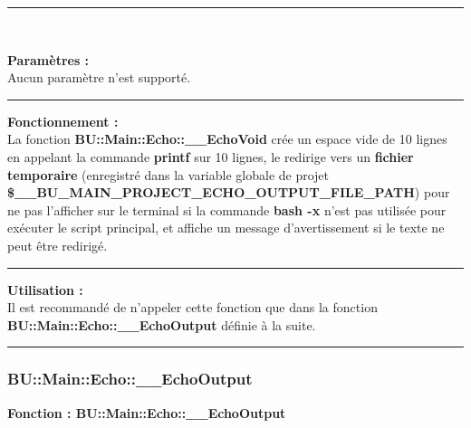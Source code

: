 \documentclass[a4paper,10pt]{article}
\begin{document}

\par\noindent\rule{\textwidth}{0.4pt}\\

\begin{justify}
    \textbf{Paramètres :}\\[1\baselineskip]
    Aucun paramètre n'est supporté.
\end{justify}


\par\noindent\rule{\textwidth}{0.4pt}

\begin{justify}
    \textbf{Fonctionnement :}\\[1\baselineskip]
    La fonction \textbf{\color{mauve}BU::Main::Echo::\_\_EchoVoid} crée un espace vide de 10 lignes en appelant la commande \textbf{\color{gray}printf} sur 10 lignes, le redirige vers un \textbf{\color{lime}fichier temporaire} (enregistré dans la variable globale de projet \textbf{\color{orange}\$\_\_BU\_MAIN\_PROJECT\_ECHO\_OUTPUT\_FILE\_PATH}) pour ne pas l'afficher sur le terminal si la commande \textbf{\color{gray}bash -x} n'est pas utilisée pour exécuter le script principal, et affiche un message d'avertissement si le texte ne peut être redirigé.
\end{justify}


\par\noindent\rule{\textwidth}{0.4pt}

\begin{justify}
    \textbf{Utilisation :}\\[1\baselineskip]
    Il est recommandé de n'appeler cette fonction que dans la fonction \textbf{\color{mauve}BU::Main::Echo::\_\_EchoOutput} définie à la suite.
\end{justify}



\color{blue}\par\noindent\rule{\textwidth}{0.4pt}\color{white}\setlength{\parskip}{1em}

\color{blue}
\subsubsection{BU::Main::Echo::\_\_EchoOutput}\color{white}

\begin{justify}
    \textbf{Fonction : \color{mauve}BU::Main::Echo::\_\_EchoOutput}
\end{justify}
\end{document}
